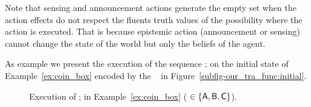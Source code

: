 %
Note that sensing and announcement actions generate the empty set when the action effects do not respect the fluents truth values of the possibility where the action is executed. That is because epistemic action (\ie announcement or sensing) cannot change the state of the world but only the beliefs of the agent.

As example we present the execution of the sequence ;  on the initial state of Example~\ref{ex:coin_box} encoded by the \pos\  in Figure~\ref{subfig-our_tra_func:initial}.
	\begin{figure}
		\centering
			\hfill	
		\caption{Execution of ; in Example~\ref{ex:coin_box} ( $\in \bra{\agent{a}, \agent{b}, \agent{c}}$).}
		\label{fig:our_tra_func}
	\end{figure}%


